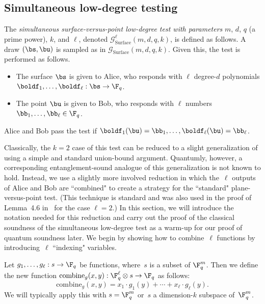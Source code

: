 \documentclass[11pt]{article}
\newcommand{\game}{\mathscr{G}}
\begin{document}
\subsection{Simultaneous low-degree testing}\label{sec:simultaneous-classical}

\begin{definition}\label{def:simultaneous-plane-v-point}
The \emph{simultaneous surface-versus-point low-degree test with parameters} $m$, $d$, $q$ (a prime power), $k$, and $\ell$, denoted $\game_{\mathrm{Surface}}^\ell(m, d, q, k)$,
 is defined as follows.
A draw $(\bs, \bu)$ is sampled as in $\game_{\mathrm{Surface}}(m,d,q,k)$. Given this, the test is performed as follows.
\begin{itemize}
\itemsep -.5pt
\item[$\circ$] The surface $\bs$ is given to Alice, who responds with $\ell$ degree-$d$ polynomials $\boldf_1, \ldots, \boldf_{\ell}: \bs \rightarrow \F_q$.
\item[$\circ$] The point $\bu$ is given to Bob, who responds with $\ell$ numbers $\bb_1, \ldots, \bb_{\ell} \in \F_q$.
\end{itemize}
Alice and Bob pass the test if $\boldf_1(\bu) = \bb_1, \ldots,
\boldf_{\ell}(\bu) = \bb_{\ell}$.
\label{def:simul}
\end{definition}
Classically, the $k=2$ case of this test can be reduced to a slight generalization of  using a
simple and standard union-bound argument.
Quantumly, however, a corresponding entanglement-sound analogue of this generalization is not known to hold.
Instead, we use a slightly more involved reduction in which the~$\ell$ outputs of Alice and Bob are ``combined" to create a strategy for the ``standard" plane-versus-point test.
(This technique is standard and was also used in the proof of Lemma~4.6 in~\cite{NV18a} for the case $\ell =2$.)
In this section, we will introduce the notation needed for this reduction
and carry out the proof of the classical soundness of the simultaneous low-degree test
as a warm-up for our proof of quantum soundness later.
We begin by showing how to combine~$\ell$ functions by introducing~$\ell$ ``indexing" variables.

\begin{notation}
Let $g_1, \ldots, g_\ell:s \rightarrow \F_q$ be functions, where~$s$ is a subset of $\F_q^m$.
Then we define the new function $\mathrm{combine}_g(x, y): \F_q^\ell \otimes s \rightarrow \F_q$ as follows:
\begin{equation*}
\mathrm{combine}_g(x, y) = x_1\cdot g_1(y) + \cdots + x_\ell \cdot g_\ell(y).
\end{equation*}
We will typically apply this with $s = \F_q^m$ or~$s$ a dimension-$k$ subspace of~$\F_q^m$.
\end{notation}
\end{document}
